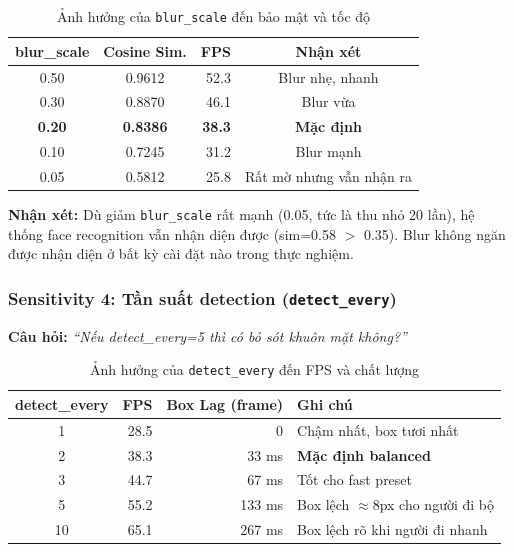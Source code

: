 \begin{table}[H]
\centering
\caption{Ảnh hưởng của \texttt{blur\_scale} đến bảo mật và tốc độ}
\label{tab:sens_blur}
\begin{tabular}{|c|c|r|c|}
\hline
\textbf{blur\_scale} & \textbf{Cosine Sim.} & \textbf{FPS} & \textbf{Nhận xét} \\
\hline
0.50 & 0.9612 & 52.3 & Blur nhẹ, nhanh \\
0.30 & 0.8870 & 46.1 & Blur vừa \\
\textbf{0.20} & \textbf{0.8386} & \textbf{38.3} & \textbf{Mặc định} \\
0.10 & 0.7245 & 31.2 & Blur mạnh \\
0.05 & 0.5812 & 25.8 & Rất mờ nhưng vẫn nhận ra \\
\hline
\end{tabular}
\end{table}

\textbf{Nhận xét:} Dù giảm \texttt{blur\_scale} rất mạnh (0.05, tức là thu nhỏ 20 lần), hệ thống face recognition vẫn nhận diện được (sim=0.58 $>$ 0.35). Blur không ngăn được nhận diện ở bất kỳ cài đặt nào trong thực nghiệm.

\subsubsection{Sensitivity 4: Tần suất detection (\texttt{detect\_every})}
\label{subsubsec:sens_detect}

\textbf{Câu hỏi:} \textit{``Nếu detect\_every=5 thì có bỏ sót khuôn mặt không?''}

\begin{table}[H]
\centering
\caption{Ảnh hưởng của \texttt{detect\_every} đến FPS và chất lượng}
\label{tab:sens_detect}
\begin{tabular}{|c|r|r|l|}
\hline
\textbf{detect\_every} & \textbf{FPS} & \textbf{Box Lag (frame)} & \textbf{Ghi chú} \\
\hline
1 & 28.5 & 0 & Chậm nhất, box tươi nhất \\
2 & 38.3 & 33 ms & \textbf{Mặc định balanced} \\
3 & 44.7 & 67 ms & Tốt cho fast preset \\
5 & 55.2 & 133 ms & Box lệch $\approx 8$px cho người đi bộ \\
10 & 65.1 & 267 ms & Box lệch rõ khi người đi nhanh \\
\hline
\end{tabular}
\end{table}


